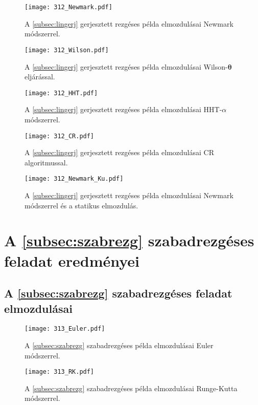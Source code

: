 \begin{figure}[H]
\centering
\texttt{[image: 312\_Newmark.pdf]}
\caption{A \ref{subsec:lingerj} gerjesztett rezgéses példa elmozdulásai Newmark módszerrel.}
\label{fig:lingerjeredm_newmark}
\end{figure}
\begin{figure}[H]
\centering
\texttt{[image: 312\_Wilson.pdf]}
\caption{A \ref{subsec:lingerj} gerjesztett rezgéses példa elmozdulásai Wilson-$\boldsymbol\theta$ eljárással.}
\label{fig:lingerjeredm_wilson}
\end{figure}
\begin{figure}[H]
\centering
\texttt{[image: 312\_HHT.pdf]}
\caption{A \ref{subsec:lingerj} gerjesztett rezgéses példa elmozdulásai HHT-$\alpha$ módszerrel.}
\label{fig:lingerjeredm_hht}
\end{figure}
\begin{figure}[H]
\centering
\texttt{[image: 312\_CR.pdf]}
\caption{A \ref{subsec:lingerj} gerjesztett rezgéses példa elmozdulásai CR algoritmussal.}
\label{fig:lingerjeredm_cr}
\end{figure}

\begin{figure}[H]
\centering
\texttt{[image: 312\_Newmark\_Ku.pdf]}
\caption{A \ref{subsec:lingerj} gerjesztett rezgéses példa elmozdulásai Newmark módszerrel és a statikus elmozdulás.}
\label{fig:lingerjeredm_newmark_Ku}
\end{figure}


\section{A \ref{subsec:szabrezg} szabadrezgéses feladat eredményei}\label{sec:függ_szabrezg}

\subsection{A \ref{subsec:szabrezg} szabadrezgéses feladat elmozdulásai}\label{sec:függ_szabrezg_elm}

\begin{figure}[H]
\centering
\texttt{[image: 313\_Euler.pdf]}
\caption{A \ref{subsec:szabrezg} szabadrezgéses példa elmozdulásai Euler módszerrel.}
\label{fig:szabrezg_er_euler}
\end{figure}

\begin{figure}[H]
\centering
\texttt{[image: 313\_RK.pdf]}
\caption{A \ref{subsec:szabrezg} szabadrezgéses példa elmozdulásai Runge-Kutta módszerrel.}
\label{fig:szabrezg_er_rk}
\end{figure}

